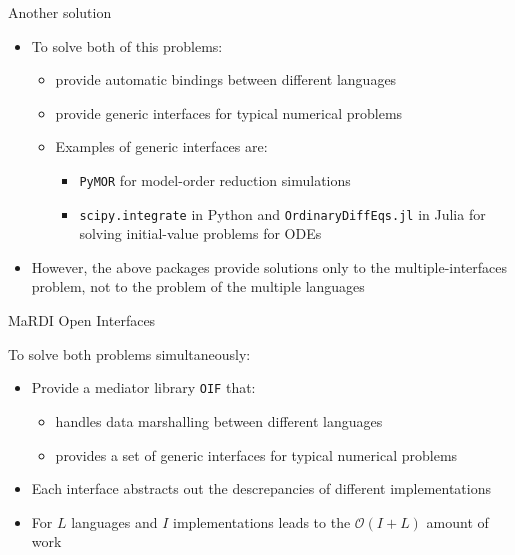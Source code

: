 \documentclass[10pt, aspectratio=169, progressbar=frametitle]{beamer}
\begin{document}
\begin{frame}{Another solution}
  \begin{itemize}
    \item To solve both of this problems:
          \begin{itemize}
            \item provide automatic bindings between different languages
            \item provide generic interfaces for typical numerical problems
            \item Examples of generic interfaces are:
                  \begin{itemize}
                    \item \texttt{PyMOR} for model-order reduction simulations
                    \item  \texttt{scipy.integrate} in Python
                          and \texttt{OrdinaryDiffEqs.jl} in Julia for solving initial-value problems for ODEs
                  \end{itemize}
          \end{itemize}
    \item However, the above packages provide solutions only
          to the multiple-interfaces problem, not to the problem
          of the multiple languages
  \end{itemize}
\end{frame}

\begin{frame}{MaRDI Open Interfaces}
  \begin{minipage}{0.45\textwidth}
    To solve both problems simultaneously:
    \begin{itemize}
      \item Provide a mediator library \texttt{OIF} that:
            \begin{itemize}
              \item handles data marshalling between different languages
              \item provides a set of generic interfaces
                    for typical numerical problems
            \end{itemize}
      \item Each interface abstracts out the descrepancies
            of different implementations
      \item For $L$ languages and $I$ implementations leads to
            the $\mathcal O (I + L)$ amount of work
    \end{itemize}
  \end{minipage}\hfill%
  \begin{minipage}{0.50\textwidth}
    
  \end{minipage}
\end{frame}
\end{document}
